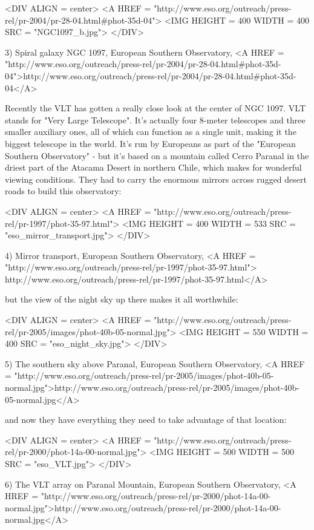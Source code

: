 <DIV ALIGN = center>
<A HREF = "http://www.eso.org/outreach/press-rel/pr-2004/pr-28-04.html#phot-35d-04">
<IMG HEIGHT = 400 WIDTH = 400 SRC = "NGC1097_b.jpg">
</DIV>

3) Spiral galaxy NGC 1097, European Southern Observatory,
<A HREF = "http://www.eso.org/outreach/press-rel/pr-2004/pr-28-04.html#phot-35d-04">http://www.eso.org/outreach/press-rel/pr-2004/pr-28-04.html#phot-35d-04</A>

Recently the VLT has gotten a really close look at the center of 
NGC 1097.  VLT stands for "Very Large Telescope".  It's actually 
four 8-meter telescopes and three smaller auxiliary ones, all of
which can function as a single unit, making it the biggest
telescope in the world.  It's run by Europeans as part of
the "European Southern Observatory" - but it's based on a
mountain called Cerro Paranal in the driest part of the Atacama 
Desert in northern Chile, which makes for wonderful viewing 
conditions.  They had to carry the enormous mirrors across 
rugged desert roads to build this observatory:

<DIV ALIGN = center>
<A HREF = "http://www.eso.org/outreach/press-rel/pr-1997/phot-35-97.html">
<IMG HEIGHT = 400 WIDTH = 533 SRC = "eso_mirror_transport.jpg">
</DIV>

4) Mirror transport, European Southern Observatory,
<A HREF = "http://www.eso.org/outreach/press-rel/pr-1997/phot-35-97.html">
http://www.eso.org/outreach/press-rel/pr-1997/phot-35-97.html</A>

but the view of the night sky up there makes it all worthwhile:

<DIV ALIGN = center>
<A HREF = "http://www.eso.org/outreach/press-rel/pr-2005/images/phot-40b-05-normal.jpg">
<IMG HEIGHT = 550 WIDTH = 400 SRC = "eso_night_sky.jpg">
</DIV>

5) The southern sky above Paranal, European Southern Observatory,
<A HREF = "http://www.eso.org/outreach/press-rel/pr-2005/images/phot-40b-05-normal.jpg">http://www.eso.org/outreach/press-rel/pr-2005/images/phot-40b-05-normal.jpg</A>

and now they have everything they need to take advantage of that location:

<DIV ALIGN = center>
<A HREF = "http://www.eso.org/outreach/press-rel/pr-2000/phot-14a-00-normal.jpg">
<IMG HEIGHT = 500 WIDTH = 500 SRC = "eso_VLT.jpg">
</DIV>

6) The VLT array on Paranal Mountain, European Southern Observatory,
<A HREF = "http://www.eso.org/outreach/press-rel/pr-2000/phot-14a-00-normal.jpg">http://www.eso.org/outreach/press-rel/pr-2000/phot-14a-00-normal.jpg</A>

